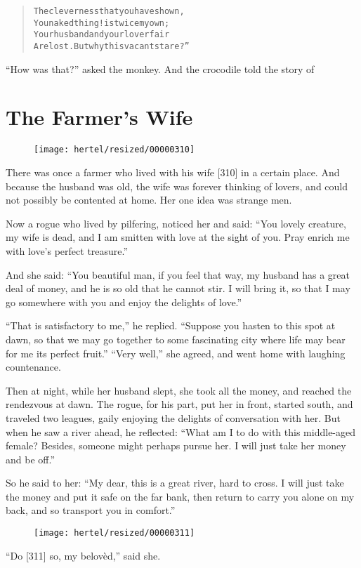 \documentclass[article, twoside, 10pt]{memoir}
\renewenvironment{verbatim}{%
\begin{quote}%
\vskip -10pt%
\begin{alltt}\normalfont\small}{\end{alltt}%
\end{quote}%
\vskip -10pt
} %
\begin{document}
\begin{verbatim}
The cleverness that you have shown,
You naked thing! is twice my own;
Your husband and your lover fair
Are lost. But why this vacant stare?”
\end{verbatim}
``How was that?'' asked the monkey. And the crocodile told the
story of

\chapter{The Farmer's Wife}

\begin{figure}[p]\texttt{[image: hertel/resized/00000310]}\end{figure}There was once a farmer who lived with his wife [310] in a certain
place. And because the husband was old, the wife was forever
thinking of lovers, and could not possibly be contented at home.
Her one idea was strange men.

Now a rogue who lived by pilfering, noticed her and said:
``You lovely creature, my wife is dead, and I am smitten with love at the sight of you. Pray enrich me with love's perfect treasure.''

And she said:
``You beautiful man, if you feel that way, my husband has a great deal of money, and he is so old that he cannot stir. I will bring it, so that I may go somewhere with you and enjoy the delights of love.''

``That is satisfactory to me,'' he replied.
``Suppose you hasten to this spot at dawn, so that we may go together to some fascinating city where life may bear for me its perfect fruit.''
``Very well,'' she agreed, and went home with laughing
countenance.

Then at night, while her husband slept, she took all the money, and
reached the rendezvous at dawn. The rogue, for his part, put her in
front, started south, and traveled two leagues, gaily enjoying the
delights of conversation with her. But when he saw a river ahead,
he reflected:
``What am I to do with this middle-aged female? Besides, someone might perhaps pursue her. I will just take her money and be off.''

So he said to her:
``My dear, this is a great river, hard to cross. I will just take the money and put it safe on the far bank, then return to carry you alone on my back, and so transport you in comfort.''
\begin{figure}[p]\texttt{[image: hertel/resized/00000311]}\end{figure}``Do [311] so, my belovèd,'' said she.
\end{document}
